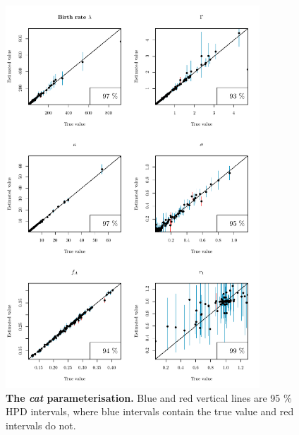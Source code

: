 \documentclass[12pt]{article}
\begin{document}
\begin{figure}[!htb]
\includegraphics[width=0.85\textwidth]{Figures/CalSim_cat.pdf}
\caption{\textbf{The \textit{cat} parameterisation.} Blue and red vertical lines are 95 \% HPD intervals, where blue intervals contain the true value and red intervals do not.}
\label{fig:rateparams}
\end{figure}
\end{document}
